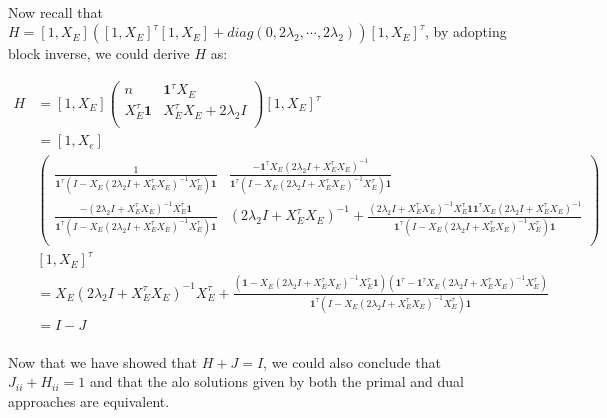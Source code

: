 \documentclass{article}
\begin{document}
\paragraph{}Now recall that $H = [1,X_{E}]([1,X_{E}]^{\tau}[1,X_{E}]+diag(0,2\lambda_{2},\cdots, 2\lambda_{2}))[1,X_{E}]^{\tau}$, by adopting block inverse, we could derive $H$ as:
\begin{center}
$
\begin{aligned}
H &= [1,X_{E}]
\left(
\begin{array}{cc}
n & \textbf{1}^{\tau}X_{E}\\
X_{E}^{\tau}\textbf{1} & X_{E}^{\tau}X_{E} + 2\lambda_{2}I\\
\end{array}
\right)
[1,X_{E}]^{\tau}\\
&= [1,X_{e}]\\
&\left(
\begin{array}{cc}
\frac{1}{\textbf{1}^{\tau}(I-X_{E}(2\lambda_{2}I+X_{E}^{\tau}X_{E})^{-1}X_{E}^{\tau})\textbf{1}} & \frac{-\textbf{1}^{\tau}X_{E}(2\lambda_{2}I+X_{E}^{\tau}X_{E})^{-1}}{\textbf{1}^{\tau}(I-X_{E}(2\lambda_{2}I+X_{E}^{\tau}X_{E})^{-1}X_{E}^{\tau})\textbf{1}}\\
\frac{-(2\lambda_{2}I+X_{E}^{\tau}X_{E})^{-1}X_{E}^{\tau}\textbf{1}}{\textbf{1}^{\tau}(I-X_{E}(2\lambda_{2}I+X_{E}^{\tau}X_{E})^{-1}X_{E}^{\tau})\textbf{1}}&(2\lambda_{2}I+X_{E}^{\tau}X_{E})^{-1}+\frac{(2\lambda_{2}I+X_{E}^{\tau}X_{E})^{-1}X_{E}^{\tau}\textbf{1}\textbf{1}^{\tau}X_{E}(2\lambda_{2}I+X_{E}^{\tau}X_{E})^{-1}}{\textbf{1}^{\tau}(I-X_{E}(2\lambda_{2}I+X_{E}^{\tau}X_{E})^{-1}X_{E}^{\tau})\textbf{1}}\\
\end{array}
\right)\\
&[1,X_{E}]^{\tau}\\
& = X_{E}(2\lambda_{2}I+X_{E}^{\tau}X_{E})^{-1}X_{E}^{\tau} + \frac{(\textbf{1}-X_{E}(2\lambda_{2}I+X_{E}^{\tau}X_{E})^{-1}X_{E}^{\tau}\textbf{1})(\textbf{1}^{\tau}-\textbf{1}^{\tau}X_{E}(2\lambda_{2}I+X_{E}^{\tau}X_{E})^{-1}X_{E}^{\tau})}{\textbf{1}^{\tau}(I-X_{E}(2\lambda_{2}I+X_{E}^{\tau}X_{E})^{-1}X_{E}^{\tau})\textbf{1}}\\
& = I-J
\end{aligned}
$
\end{center}
\paragraph{}Now that we have showed that $H+J=I$, we could also conclude that $J_{ii}+H_{ii}=1$ and that the alo solutions given by both the primal and dual approaches are equivalent.
\end{document}
